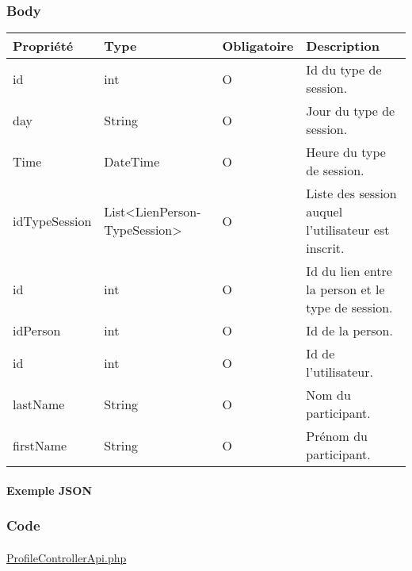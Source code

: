 	\subsubsection{Body}
		\begin{center}
			\begin{tabularx}{\textwidth}{| T{0.2122\textwidth} | S{0.22\textwidth} | S{0.15\textwidth} | S{0.3\textwidth} |}
				\hline
				Propriété & Type & Obligatoire & Description \\
				\hline
				id & int & O & Id du type de session. \\
				\hline
				day & String & O & Jour du type de session. \\
				\hline
				Time & DateTime & O & Heure du type de session. \\
				\hline
				idTypeSession & List<LienPerson- TypeSession> & O & Liste des session auquel l'utilisateur est inscrit. \\
				\hline
				
				\hline
				
				\hline
				id & int & O & Id du lien entre la person et le type de session. \\ 
				\hline
				idPerson & int & O & Id de la person. \\
				\hline
				
				\hline
				
				\hline
				id & int & O & Id de l'utilisateur. \\
				\hline
				lastName & String & O & Nom du participant. \\
				\hline
				firstName & String & O & Prénom du participant. \\
				\hline

			\end{tabularx}
		\end{center}
		
	\newpage
		\paragraph{Exemple JSON}
			\paragraph{}
			
			
			
	\subsubsection{Code}
		\paragraph{}
			\href{https://github.com/victorsmits/Aquabike/blob/master/backend/src/Controller/API/ProfileControllerApi.php}{ProfileControllerApi.php}
